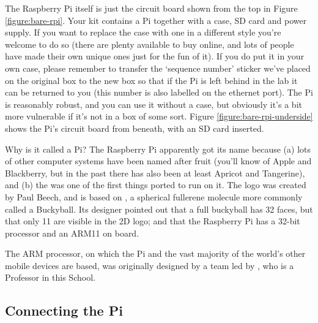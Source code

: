 The Raspberry Pi itself is just the circuit board shown from the top in Figure \ref{figure:bare-rpi}. Your kit contains a Pi together with a case, SD card and power supply. If you want to replace the case with one in a different style you're welcome to do so (there are plenty available to buy online, and lots of people have made their own unique ones just for the fun of it). If you do put it in your own case, please remember to transfer the `sequence number' sticker we've placed on the original box to the new box so that if the Pi is left behind in the lab it can be returned to you (this number is also labelled on the ethernet port). The Pi is reasonably robust, and you can use it without a case, but obviously it's a bit more vulnerable if it's not in a box of some sort. Figure \ref{figure:bare-rpi-underside} shows the Pi's circuit board from beneath, with an SD card inserted.

\begin{rpi}{Why is it called a Pi?}
  The Raspberry Pi apparently got its name because (a) lots of other computer systems have been named after fruit (you'll know of Apple and Blackberry, but in the past there has also been at least Apricot and Tangerine), and (b) the  was one of the first things ported to run on it. The logo was created by Paul Beech, and is based on , a spherical fullerene molecule more commonly called a Buckyball. Its designer pointed out that a full buckyball has 32 faces, but that only 11 are visible in the 2D logo; and that the Raspberry Pi has a 32-bit processor and an ARM11 on board.

The ARM processor, on which the Pi and the vast majority of the world's other mobile devices are based, was originally designed by a team led by , who is a Professor in this School.  
\end{rpi}

\subsection{Connecting the Pi}
\label{sec:connecting-pi}


